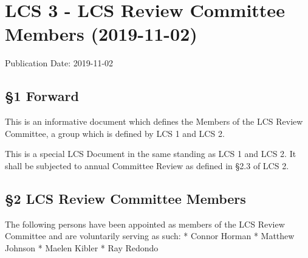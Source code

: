 \section{LCS 3 - LCS Review Committee Members
(2019-11-02)}\label{lcs-3---lcs-review-committee-members-2019-11-02}

Publication Date: 2019-11-02

\subsection{§1 Forward}\label{forward}

This is an informative document which defines the Members of the LCS
Review Committee, a group which is defined by LCS 1 and LCS 2.

This is a special LCS Document in the same standing as LCS 1 and LCS 2.
It shall be subjected to annual Committee Review as defined in §2.3 of
LCS 2.

\subsection{§2 LCS Review Committee
Members}\label{lcs-review-committee-members}

The following persons have been appointed as members of the LCS Review
Committee and are voluntarily serving as such: * Connor Horman * Matthew
Johnson * Maelen Kibler * Ray Redondo
